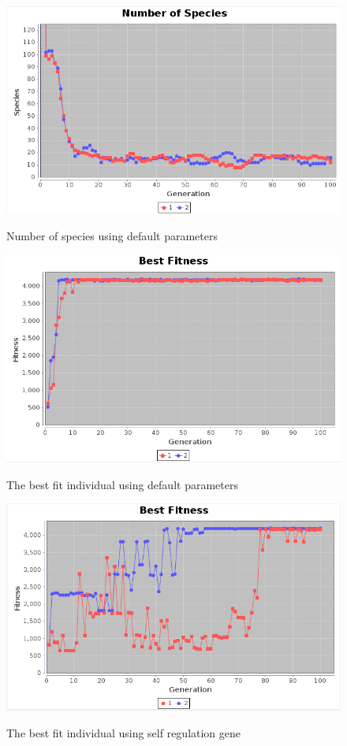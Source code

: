 \documentclass[12pt]{ucthesis} \newif\ifpdf \ifx\pdfoutput\undefined
\begin{document}
\begin{figure}[h!]
  \caption{Number of species using default parameters}
  \centering
    \includegraphics[width=1\textwidth]{graphsone/defaultspecies.png}
   \label{fig:defaultspecies} 
\end{figure}

\begin{figure}[h!]
  \caption{The best fit individual using default parameters}
  \centering
    \includegraphics[width=1\textwidth]{graphsone/defaultbest.png}
   \label{fig:defaultbest} 
\end{figure}

\begin{figure}[h!]
  \caption{The best fit individual using self regulation gene}
  \centering
    \includegraphics[width=1\textwidth]{graphsone/selfreg_default_best.png}
   \label{fig:selfreg_default_best} 
\end{figure}
\end{document}
